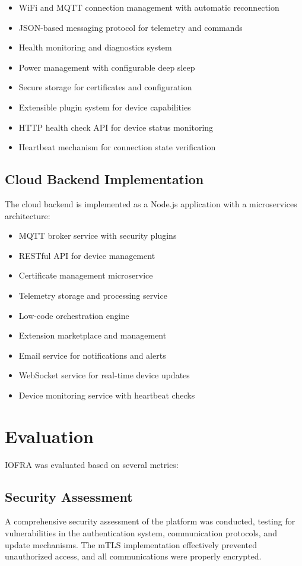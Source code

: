 \documentclass[conference]{IEEEtran}
\begin{document}
\begin{itemize}
    \item WiFi and MQTT connection management with automatic reconnection
    \item JSON-based messaging protocol for telemetry and commands
    \item Health monitoring and diagnostics system
    \item Power management with configurable deep sleep
    \item Secure storage for certificates and configuration
    \item Extensible plugin system for device capabilities
    \item HTTP health check API for device status monitoring
    \item Heartbeat mechanism for connection state verification
\end{itemize}

\subsection{Cloud Backend Implementation}
The cloud backend is implemented as a Node.js application with a microservices architecture:

\begin{itemize}
    \item MQTT broker service with security plugins
    \item RESTful API for device management
    \item Certificate management microservice
    \item Telemetry storage and processing service
    \item Low-code orchestration engine
    \item Extension marketplace and management
    \item Email service for notifications and alerts
    \item WebSocket service for real-time device updates
    \item Device monitoring service with heartbeat checks
\end{itemize}

\section{Evaluation}
IOFRA was evaluated based on several metrics:

\subsection{Security Assessment}
A comprehensive security assessment of the platform was conducted, testing for vulnerabilities in the authentication system, communication protocols, and update mechanisms. The mTLS implementation effectively prevented unauthorized access, and all communications were properly encrypted.
\end{document}
